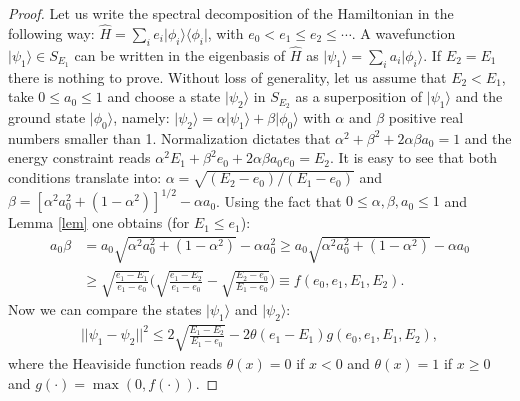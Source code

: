 \documentclass[aps,twocolumn,showpacs,pra,superscriptaddress,floatfix,longbibliography]{revtex4-1}
\newcommand{\7}{\dagger}
\newcommand{\bra}[1]{\mbox{$\langle #1 |$}}
\newcommand{\ket}[1]{\mbox{$| #1 \rangle$}}
\begin{document}
\begin{proof}
Let us write the spectral decomposition of the Hamiltonian in 
the following way:
$\hat H = \sum_i e_i \ket{\phi_i}\bra{\phi_i}$,
with $e_0 < e_1 \leq e_2 \leq \cdots$. 
A wavefunction $\ket{\psi_1} \in S_{E_1}$
can be written in the eigenbasis of  $\hat H$ as 
$
\ket{\psi_1} = \sum_i a_i \ket{\phi_i} .
$ 
If $E_2 = E_1$ there is nothing to prove. 
Without loss of generality, 
let us assume that $E_2 < E_1$, take $0 \leq a_0 \leq 1$
and choose a state $\ket{\psi_2}$ in  $S_{E_2}$ as a 
superposition of $\ket{\psi_1}$ and the ground state
$\ket{\phi_0}$, namely:
$
\ket{\psi_2} = \alpha \ket{\psi_1} + \beta \ket{\phi_0}
$
with $\alpha$ and $\beta$ positive real numbers smaller than 1.
Normalization dictates that 
$
\alpha^2 + \beta^2 + 2\alpha \beta a_0 = 1
$
and the energy constraint reads 
$\alpha^2 E_1 + \beta^2 e_0 + 2\alpha \beta 
a_0 e_0 = E_2$. It is easy to see that both 
conditions translate into:
$\alpha = \sqrt{(E_2-e_0)/(E_1-e_0)}$
and
$\beta = [\alpha^2 a_0^2 + (1- \alpha^2)]^{1/2}- \alpha a_0$.
Using the fact that $0 \leq \alpha, \beta, a_0 \leq 1$
and Lemma \ref{lem} one obtains (for $E_1 \leq e_1$): 
\begin{align}
a_0 \beta  &= a_0\sqrt{\alpha^2 a_0^2 + (1- \alpha^2)}- \alpha a_0^2 
\geq a_0\sqrt{\alpha^2 a_0^2 + (1- \alpha^2)} - \alpha a_0
\nonumber
\\
&\geq \sqrt{\frac{e_1-E_1}{e_1-e_0}}
\Bigg(\sqrt{\frac{e_1-E_2}{e_1-e_0}}-
\sqrt{\frac{E_2-e_0}{E_1-e_0}}\Bigg)
\nonumber
\equiv f(e_0,e_1,E_1,E_2).
\end{align}
Now we can compare  the states $\ket{\psi_1}$ and $\ket{\psi_2}$:
\begin{align*}
||\psi_1 - \psi_2||^2 
\leq 2\sqrt{\frac{E_1-E_2}{E_1-e_0}} - 2\theta(e_1-E_1)
g(e_0,e_1,E_1,E_2),
\end{align*}
where the Heaviside function reads
$\theta(x) = 0$ if $x <0$ and $\theta(x) = 1$ if $x \geq 0$
and $g(\cdot) = \max(0,  f(\cdot))$.
\end{proof}



\end{document}
